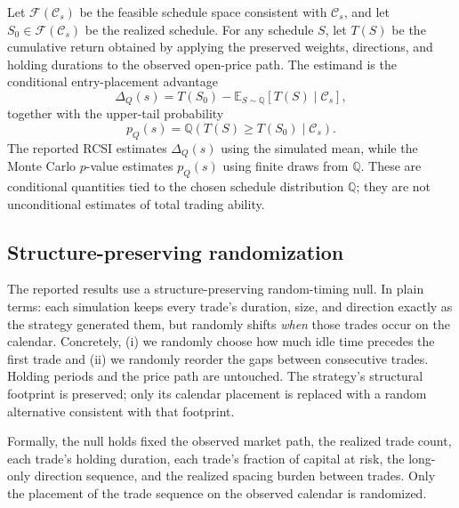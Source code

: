 \documentclass[preprint,12pt]{elsarticle}
\theoremstyle{definition}
\begin{document}
Let $\mathcal{F}(\mathcal{C}_s)$ be the feasible schedule space consistent with $\mathcal{C}_s$, and let $S_0\in \mathcal{F}(\mathcal{C}_s)$ be the realized schedule. For any schedule $S$, let $T(S)$ be the cumulative return obtained by applying the preserved weights, directions, and holding durations to the observed open-price path. The estimand is the conditional entry-placement advantage
\[
\Delta_Q(s)=T(S_0)-\mathbb{E}_{S\sim \mathbb{Q}}\!\left[T(S)\mid \mathcal{C}_s\right],
\]
together with the upper-tail probability
\[
p_Q(s)=\mathbb{Q}\!\left(T(S)\ge T(S_0)\mid \mathcal{C}_s\right).
\]
The reported RCSI estimates $\Delta_Q(s)$ using the simulated mean, while the Monte Carlo $p$-value estimates $p_Q(s)$ using finite draws from $\mathbb{Q}$. These are conditional quantities tied to the chosen schedule distribution $\mathbb{Q}$; they are not unconditional estimates of total trading ability.

\subsection{Structure-preserving randomization}
\label{sec:spr}

The reported results use a structure-preserving random-timing null. In plain terms: each simulation keeps every trade's duration, size, and direction exactly as the strategy generated them, but randomly shifts \emph{when} those trades occur on the calendar. Concretely, (i) we randomly choose how much idle time precedes the first trade and (ii) we randomly reorder the gaps between consecutive trades. Holding periods and the price path are untouched. The strategy's structural footprint is preserved; only its calendar placement is replaced with a random alternative consistent with that footprint.

Formally, the null holds fixed the observed market path, the realized trade count, each trade's holding duration, each trade's fraction of capital at risk, the long-only direction sequence, and the realized spacing burden between trades. Only the placement of the trade sequence on the observed calendar is randomized.
\end{document}
